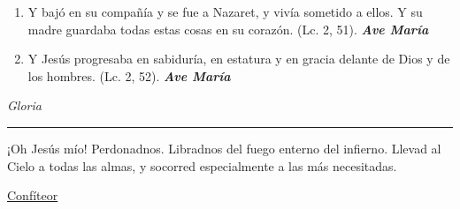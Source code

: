 \documentclass[a4paper,11pt, oneside]{report}
\begin{document}
{{\begin{enumerate}
      \item Y bajó en su compañía y se fue a Nazaret, y vivía sometido a ellos. Y su madre guardaba todas estas
      cosas en su corazón. (Lc. 2, 51). \textbf{\textit{Ave María}}

      \item Y Jesús progresaba en sabiduría, en estatura y en gracia delante de Dios y de los hombres. (Lc. 2, 52). \textbf{\textit{Ave María}}

    \end{enumerate}
    \indent\textit{Gloria}

    \begin{center}\rule{1\linewidth}{\linethickness}\end{center}

    \medskip
    \hypertarget{finalPerdida}{¡Oh Jesús mío! Perdonadnos. Libradnos del fuego enterno del infierno. Llevad al Cielo a todas las almas, y socorred especialmente a las más 
    necesitadas.}
  }
  \par\bigskip
  \hyperlink{sec:confiteor}{Confíteor}
}
\end{document}
